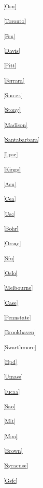 \begin{multicols}{2}
\noindent
\textsuperscript{\ref{Osu}}\Osutext

\noindent
\textsuperscript{\ref{Toronto}}\Torontotext

\noindent
\textsuperscript{\ref{Fsu}}\Fsutext

\noindent
\textsuperscript{\ref{Davis}}\Davistext

\noindent
\textsuperscript{\ref{Pitt}}\Pitttext

\noindent
\textsuperscript{\ref{Ferrara}}\Ferraratext

\noindent
\textsuperscript{\ref{Sussex}}\Sussextext

\noindent
\textsuperscript{\ref{Stony}}\Stonytext

\noindent
\textsuperscript{\ref{Madison}}\Madisontext

\noindent
\textsuperscript{\ref{Santabarbara}}\Santabarbaratext

\noindent
\textsuperscript{\ref{Lpsc}}\Lpsctext

\noindent
\textsuperscript{\ref{Kings}}\Kingstext

\noindent
\textsuperscript{\ref{Asu}}\Asutext

\noindent
\textsuperscript{\ref{Cea}}\Ceatext

\noindent
\textsuperscript{\ref{Usc}}\Usctext

\noindent
\textsuperscript{\ref{Bohr}}\Bohrtext

\noindent
\textsuperscript{\ref{Orsay}}\Orsaytext

\noindent
\textsuperscript{\ref{Sfu}}\Sfutext

\noindent
\textsuperscript{\ref{Oslo}}\Oslotext

\noindent
\textsuperscript{\ref{Melbourne}}\Melbournetext

\noindent
\textsuperscript{\ref{Case}}\Casetext

\noindent
\textsuperscript{\ref{Pennstate}}\Pennstatetext

\noindent
\textsuperscript{\ref{Brookhaven}}\Brookhaventext

\noindent
\textsuperscript{\ref{Swarthmore}}\Swarthmoretext

\noindent
\textsuperscript{\ref{Hpd}}\Hpdtext

\noindent
\textsuperscript{\ref{Umass}}\Umasstext

\noindent
\textsuperscript{\ref{Iucaa}}\Iucaatext

\noindent
\textsuperscript{\ref{Sao}}\Saotext

\noindent
\textsuperscript{\ref{Mit}}\Mittext

\noindent
\textsuperscript{\ref{Mpa}}\Mpatext

\noindent
\textsuperscript{\ref{Brown}}\Browntext

\noindent
\textsuperscript{\ref{Syracuse}}\Syracusetext

\noindent
\textsuperscript{\ref{Gsfc}}\Gsfctext

\normalsize

\end{multicols}

\parskip=8pt
